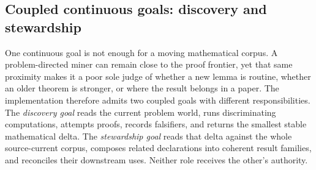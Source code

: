 \documentclass[10pt]{article}
\begin{document}
\subsection{Coupled continuous goals: discovery and stewardship}

One continuous goal is not enough for a moving mathematical corpus. A
problem-directed miner can remain close to the proof frontier, yet that same
proximity makes it a poor sole judge of whether a new lemma is routine,
whether an older theorem is stronger, or where the result belongs in a paper.
The implementation therefore admits two coupled goals with different
responsibilities. The \emph{discovery goal} reads the current problem world,
runs discriminating computations, attempts proofs, records falsifiers, and
returns the smallest stable mathematical delta. The \emph{stewardship goal}
reads that delta against the whole source-current corpus, composes related
declarations into coherent result families, and reconciles their downstream
uses. Neither role receives the other's authority.
\end{document}
